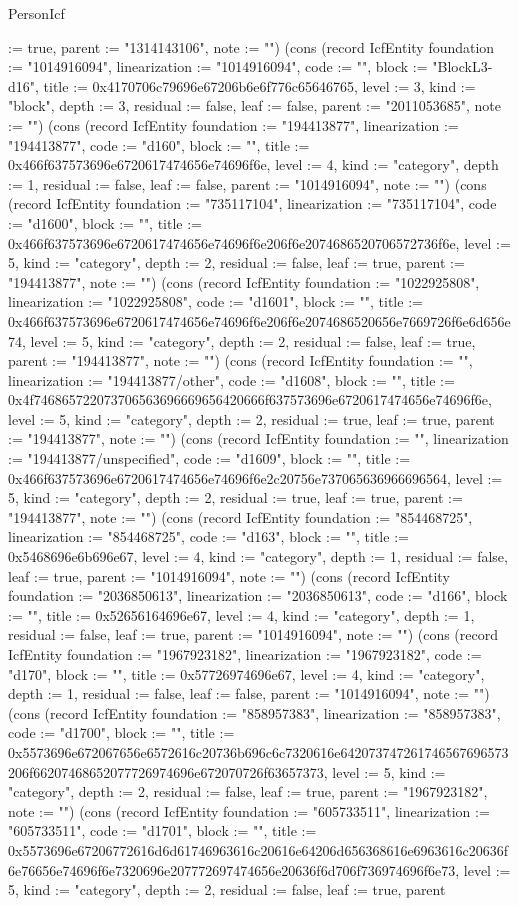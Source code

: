 \begin{lexlean}{PersonIcf}
\begin{semanticmodule}
{:= true, parent := "1314143106", note := ""}) (cons (record IcfEntity {foundation := "1014916094", linearization := "1014916094", code := "", block := "BlockL3-d16", title := 0x4170706c79696e67206b6e6f776c65646765, level := 3, kind := "block", depth := 3, residual := false, leaf := false, parent := "2011053685", note := ""}) (cons (record IcfEntity {foundation := "194413877", linearization := "194413877", code := "d160", block := "", title := 0x466f637573696e6720617474656e74696f6e, level := 4, kind := "category", depth := 1, residual := false, leaf := false, parent := "1014916094", note := ""}) (cons (record IcfEntity {foundation := "735117104", linearization := "735117104", code := "d1600", block := "", title := 0x466f637573696e6720617474656e74696f6e206f6e2074686520706572736f6e, level := 5, kind := "category", depth := 2, residual := false, leaf := true, parent := "194413877", note := ""}) (cons (record IcfEntity {foundation := "1022925808", linearization := "1022925808", code := "d1601", block := "", title := 0x466f637573696e6720617474656e74696f6e206f6e2074686520656e7669726f6e6d656e74, level := 5, kind := "category", depth := 2, residual := false, leaf := true, parent := "194413877", note := ""}) (cons (record IcfEntity {foundation := "", linearization := "194413877/other", code := "d1608", block := "", title := 0x4f746865722073706563696669656420666f637573696e6720617474656e74696f6e, level := 5, kind := "category", depth := 2, residual := true, leaf := true, parent := "194413877", note := ""}) (cons (record IcfEntity {foundation := "", linearization := "194413877/unspecified", code := "d1609", block := "", title := 0x466f637573696e6720617474656e74696f6e2c20756e737065636966696564, level := 5, kind := "category", depth := 2, residual := true, leaf := true, parent := "194413877", note := ""}) (cons (record IcfEntity {foundation := "854468725", linearization := "854468725", code := "d163", block := "", title := 0x5468696e6b696e67, level := 4, kind := "category", depth := 1, residual := false, leaf := true, parent := "1014916094", note := ""}) (cons (record IcfEntity {foundation := "2036850613", linearization := "2036850613", code := "d166", block := "", title := 0x52656164696e67, level := 4, kind := "category", depth := 1, residual := false, leaf := true, parent := "1014916094", note := ""}) (cons (record IcfEntity {foundation := "1967923182", linearization := "1967923182", code := "d170", block := "", title := 0x57726974696e67, level := 4, kind := "category", depth := 1, residual := false, leaf := false, parent := "1014916094", note := ""}) (cons (record IcfEntity {foundation := "858957383", linearization := "858957383", code := "d1700", block := "", title := 0x5573696e672067656e6572616c20736b696c6c7320616e642073747261746567696573206f66207468652077726974696e672070726f63657373, level := 5, kind := "category", depth := 2, residual := false, leaf := true, parent := "1967923182", note := ""}) (cons (record IcfEntity {foundation := "605733511", linearization := "605733511", code := "d1701", block := "", title := 0x5573696e67206772616d6d61746963616c20616e64206d656368616e6963616c20636f6e76656e74696f6e7320696e207772697474656e20636f6d706f736974696f6e73, level := 5, kind := "category", depth := 2, residual := false, leaf := true, parent }
\end{semanticmodule}
\end{lexlean}
